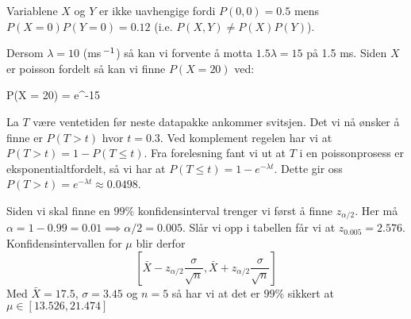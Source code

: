 \deloppgave
Variablene $X$ og $Y$ er ikke uavhengige fordi $P(0, 0) = 0.5$ mens $P(X = 0)P(Y = 0) = 0.12$ (i.e. $P(X, Y) \neq P(X)P(Y)$). 

\oppgave
\deloppgave
Dersom $\lambda = 10$ (ms$\,^{-1}$) så kan vi forvente å motta $1.5\lambda = 15$ på 1.5 ms. Siden $X$ er poisson fordelt så kan vi finne $P(X = 20)$ ved:
\begin{likning}
	P(X = 20) =  e^{-15} 
\end{likning}

\deloppgave
La $T$ være ventetiden før neste datapakke ankommer svitsjen. Det vi nå ønsker å finne er $P(T > t)$ hvor $t = 0.3$. Ved komplement regelen har vi at $P(T > t) = 1 - P(T \leq t)$. Fra forelesning fant vi ut at $T$ i en poissonprosess er eksponentialtfordelt, så vi har at $P(T \leq t) = 1 - e^{-\lambda t}$. Dette gir oss $P(T > t) = e^{-\lambda t} \approx 0.0498$.

\oppgave
Siden vi skal finne en $99\%$ konfidensinterval trenger vi først å finne $z_{\alpha/2}$. Her må $\alpha = 1 - 0.99 = 0.01 \implies \alpha/2 = 0.005$. Slår vi opp i tabellen får vi at $z_{0.005} = 2.576$. Konfidensintervallen for $\mu$ blir derfor 
$$
\left[\bar{X} - z_{\alpha/2}\dfrac{\sigma}{\sqrt{n}}, \bar{X} + z_{\alpha/2}\dfrac{\sigma}{\sqrt{n}}\right]
$$ 
Med $\bar{X} = 17.5$, $\sigma = 3.45$ og $n = 5$ så har vi at det er $99\%$ sikkert at $\mu \in \left[13.526, 21.474\right]$

